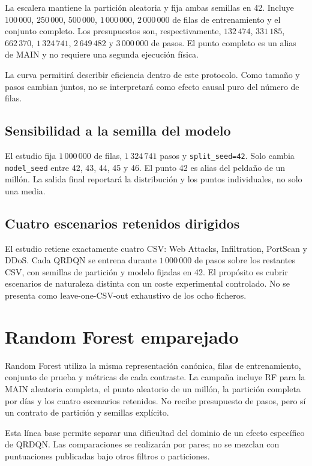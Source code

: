 La escalera mantiene la partición aleatoria y fija ambas semillas en 42. Incluye $100\,000$, $250\,000$, $500\,000$, $1\,000\,000$, $2\,000\,000$ de filas de entrenamiento y el conjunto completo. Los presupuestos son, respectivamente, $132\,474$, $331\,185$, $662\,370$, $1\,324\,741$, $2\,649\,482$ y $3\,000\,000$ de pasos. El punto completo es un alias de MAIN y no requiere una segunda ejecución física.

La curva permitirá describir eficiencia dentro de este protocolo. Como tamaño y pasos cambian juntos, no se interpretará como efecto causal puro del número de filas.

\subsection{Sensibilidad a la semilla del modelo}

El estudio fija $1\,000\,000$ de filas, $1\,324\,741$ pasos y \texttt{split\_seed=42}. Solo cambia \texttt{model\_seed} entre 42, 43, 44, 45 y 46. El punto 42 es alias del peldaño de un millón. La salida final reportará la distribución y los puntos individuales, no solo una media.

\subsection{Cuatro escenarios retenidos dirigidos}

El estudio retiene exactamente cuatro CSV: Web Attacks, Infiltration, PortScan y DDoS. Cada QRDQN se entrena durante $1\,000\,000$ de pasos sobre los restantes CSV, con semillas de partición y modelo fijadas en 42. El propósito es cubrir escenarios de naturaleza distinta con un coste experimental controlado. No se presenta como leave-one-CSV-out exhaustivo de los ocho ficheros.

\section{Random Forest emparejado}

Random Forest utiliza la misma representación canónica, filas de entrenamiento, conjunto de prueba y métricas de cada contraste. La campaña incluye RF para la MAIN aleatoria completa, el punto aleatorio de un millón, la partición completa por días y los cuatro escenarios retenidos. No recibe presupuesto de pasos, pero sí un contrato de partición y semillas explícito.

Esta línea base permite separar una dificultad del dominio de un efecto específico de QRDQN. Las comparaciones se realizarán por pares; no se mezclan con puntuaciones publicadas bajo otros filtros o particiones.

